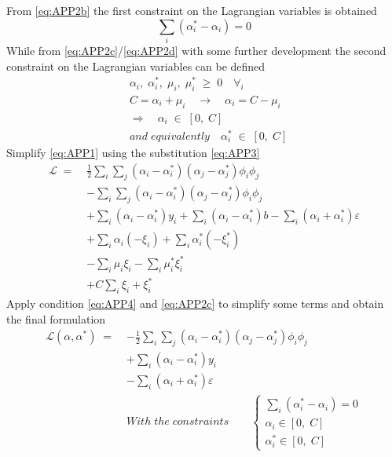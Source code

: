 \documentclass[12pt]{article}
\newcommand{\Lagr}{\mathcal{L}}
\begin{document}
From \eqref{eq:APP2b} the first constraint on the Lagrangian variables is obtained
\begin{equation}\label{eq:APP4}
    \sum_i (\alpha_i^* - \alpha_i) = 0
\end{equation}
While from \eqref{eq:APP2c}/\eqref{eq:APP2d} with some further development the second constraint on the Lagrangian variables can be defined
\begin{equation*}
    \begin{aligned}
        &\alpha_i,\;\alpha_i^*,\;\mu_i,\;\mu_i^*\;\geq\;0 \quad \forall_i \\
        &C = \alpha_i + \mu_i\quad\longrightarrow\quad\alpha_i = C - \mu_i \\
        &\Longrightarrow\quad\alpha_i\;\in\;[0,\;C]\\
        &and\;equivalently\quad\alpha_i^*\;\in\;[0,\;C]
    \end{aligned}
\end{equation*}
Simplify \eqref{eq:APP1} using the substitution \eqref{eq:APP3}
\begin{equation*}
    \begin{aligned}
        \Lagr\;=\;&\frac{1}{2} \sum_i \sum_j (\alpha_i - \alpha_i^*)(\alpha_j - \alpha_j^*)\phi_i\phi_j \\
        &-\sum_i \sum_j (\alpha_i - \alpha_i^*)(\alpha_j - \alpha_j^*)\phi_i\phi_j \\
        &+\sum_i (\alpha_i - \alpha_i^*)y_i
        +\sum_i (\alpha_i - \alpha_i^*)b
        -\sum_i (\alpha_i + \alpha_i^*)\varepsilon \\
        &+\sum_i \alpha_i(-\xi_i) + \sum_i\alpha_i^*(-\xi_i^*) \\
        &-\sum_i \mu_i\xi_i - \sum_i \mu_i^*\xi_i^* \\
        & +C\sum_i \xi_i + \xi_i^*
    \end{aligned}
\end{equation*}
Apply condition \eqref{eq:APP4} and \eqref{eq:APP2c} to simplify some terms and obtain the final formulation
\begin{equation*}
    \begin{aligned}
        \Lagr(\alpha, \alpha^*)\;=\;&-\frac{1}{2}\sum_i\sum_j (\alpha_i - \alpha_i^*)(\alpha_j - \alpha_j^*)\phi_i\phi_j \\
        &+ \sum_i (\alpha_i - \alpha_i^*)y_i \\
        &- \sum_i (\alpha_i + \alpha_i^*)\varepsilon \\
        &With\;the\;constraints\qquad
        \begin{cases}
            \sum_i (\alpha_i^* - \alpha_i) = 0 \\
            \alpha_i\in[0,\;C] \\
            \alpha_i^*\in[0,\;C]
        \end{cases}
    \end{aligned}
\end{equation*}
\end{document}
